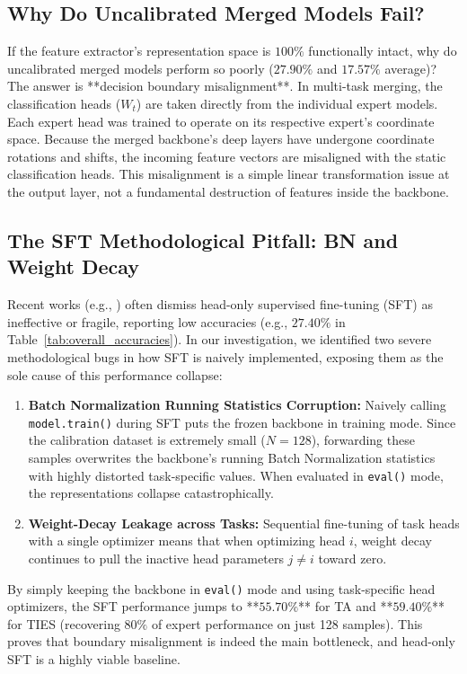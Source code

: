 \documentclass{article}
\theoremstyle{plain}
\theoremstyle{definition}
\theoremstyle{remark}
\begin{document}
\subsection{Why Do Uncalibrated Merged Models Fail?}
If the feature extractor's representation space is $100\%$ functionally intact, why do uncalibrated merged models perform so poorly ($27.90\%$ and $17.57\%$ average)?
The answer is **decision boundary misalignment**. In multi-task merging, the classification heads ($W_t$) are taken directly from the individual expert models. Each expert head was trained to operate on its respective expert's coordinate space. Because the merged backbone's deep layers have undergone coordinate rotations and shifts, the incoming feature vectors are misaligned with the static classification heads.
This misalignment is a simple linear transformation issue at the output layer, not a fundamental destruction of features inside the backbone.

\subsection{The SFT Methodological Pitfall: BN and Weight Decay}
Recent works (e.g., \cite{yang2024adamerging}) often dismiss head-only supervised fine-tuning (SFT) as ineffective or fragile, reporting low accuracies (e.g., $27.40\%$ in Table~\ref{tab:overall_accuracies}).
In our investigation, we identified two severe methodological bugs in how SFT is naively implemented, exposing them as the sole cause of this performance collapse:
\begin{enumerate}
  \item \textbf{Batch Normalization Running Statistics Corruption:} Naively calling \texttt{model.train()} during SFT puts the frozen backbone in training mode. Since the calibration dataset is extremely small ($N=128$), forwarding these samples overwrites the backbone's running Batch Normalization statistics with highly distorted task-specific values. When evaluated in \texttt{eval()} mode, the representations collapse catastrophically.
  \item \textbf{Weight-Decay Leakage across Tasks:} Sequential fine-tuning of task heads with a single optimizer means that when optimizing head $i$, weight decay continues to pull the inactive head parameters $j \neq i$ toward zero.
\end{enumerate}
By simply keeping the backbone in \texttt{eval()} mode and using task-specific head optimizers, the SFT performance jumps to **$55.70\%$** for TA and **$59.40\%$** for TIES (recovering $80\%$ of expert performance on just 128 samples). This proves that boundary misalignment is indeed the main bottleneck, and head-only SFT is a highly viable baseline.
\end{document}

